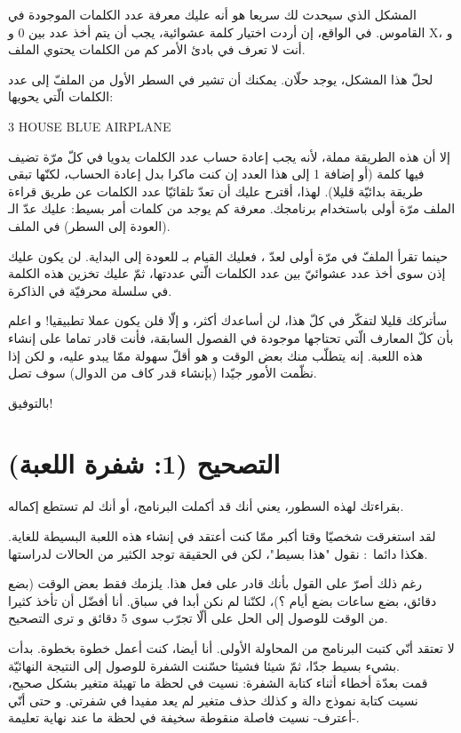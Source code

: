 المشكل الذي سيحدث لك سريعا هو أنه عليك معرفة عدد الكلمات الموجودة في القاموس. في الواقع، إن أردت اختيار كلمة عشوائية، يجب أن يتم أخذ عدد بين 0 و
\textenglish{X}،
و أنت لا تعرف في بادئ الأمر كم من الكلمات يحتوي الملف.

لحلّ هذا المشكل، يوجد حلّان. يمكنك أن تشير في السطر الأول من الملفّ إلى عدد الكلمات الّتي يحويها:

\begin{Console}
3
HOUSE
BLUE
AIRPLANE
\end{Console}

إلا أن هذه الطريقة مملة، لأنه يجب إعادة حساب عدد الكلمات يدويا في كلّ مرّة تضيف فيها كلمة (أو إضافة 1 إلى هذا العدد إن كنت ماكرا بدل إعادة الحساب، لكنّها تبقى طريقة بدائيّة قليلا). لهذا، أقترح عليك أن تعدّ تلقائيّا عدد الكلمات عن طريق قراءة الملف مرّة أولى باستخدام برنامجك. معرفة كم يوجد من كلمات أمر بسيط: عليك عدّ الـ
(العودة إلى السطر) في الملف.

حينما تقرأ الملفّ في مرّة أولى لعدّ
،
فعليك القيام بـ
للعودة إلى البداية. لن يكون عليك إذن سوى أخذ عدد عشوائيّ بين عدد الكلمات الّتي عددتها، ثمّ عليك تخزين هذه الكلمة في سلسلة محرفيّة في الذاكرة.

سأتركك قليلا لتفكّر في كلّ هذا، لن أساعدك أكثر، و إلّا فلن يكون عملا تطبيقيا! و اعلم بأن  كلّ المعارف الّتي تحتاجها موجودة في الفصول السابقة، فأنت قادر تماما على إنشاء هذه اللعبة. إنه يتطلّب منك بعض الوقت و هو أقلّ سهولة ممّا يبدو عليه، و لكن إذا نظّمت الأمور جيّدا (بإنشاء قدر كاف من الدوال) سوف تصل.

بالتوفيق!

\section{التصحيح (1: شفرة اللعبة)}

بقراءتك لهذه السطور، يعني أنك قد أكملت البرنامج، أو أنك لم تستطع إكماله.

لقد استغرقت شخصيّا وقتا أكبر ممّا كنت أعتقد في إنشاء هذه اللعبة البسيطة للغاية. هكذا دائما~: نقول "هذا بسيط"، لكن في الحقيقة توجد الكثير من الحالات لدراستها.

رغم ذلك أصرّ على القول بأنك قادر على فعل هذا. يلزمك فقط بعض الوقت (بضع دقائق، بضع ساعات بضع أيام ؟)، لكنّنا لم نكن أبدا في سباق. أنا أفضّل أن تأخذ كثيرا من الوقت للوصول إلى الحل على ألّا تجرّب سوى 5 دقائق و ترى التصحيح.

لا تعتقد أنّي كتبت البرنامج من المحاولة الأولى. أنا أيضا، كنت أعمل خطوة بخطوة. بدأت بشيء بسيط جدّا، ثمّ شيئا فشيئا حسّنت الشفرة للوصول إلى النتيجة النهائيّة.\\
قمت بعدّة أخطاء أثناء كتابة الشفرة: نسيت في لحظة ما تهيئة متغير بشكل صحيح، نسيت كتابة نموذج دالة و كذلك حذف متغير لم يعد مفيدا في شفرتي. و حتى أنّي -أعترف- نسيت فاصلة منقوطة سخيفة في لحظة ما عند نهاية تعليمة.

